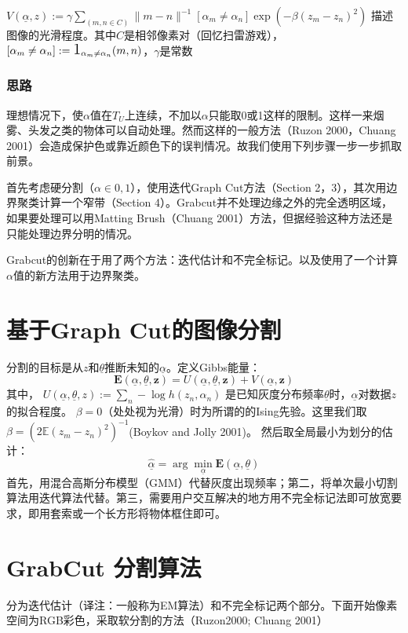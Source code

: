 \documentclass[a4paper, 11pt, nofonts, nocap, fancyhdr, hyperref, UTF8]{ctexart}
\begin{document}
$V(\underline{\alpha},z) := \gamma \sum_{(m,n \in C)} \|m-n\|^{-1}[\alpha_m \neq \alpha_n]  \exp (-\beta(z_m - z_n)^2)$  描述图像的光滑程度。其中$C$是相邻像素对（回忆扫雷游戏），$[\alpha_m \neq \alpha_n] := \text{\Large 1}_{\alpha_m \neq \alpha_n}(m,n)$，$\gamma$是常数

\subsubsection{思路}
理想情况下，使$\alpha$值在$T_U$上连续，不加以$\alpha$只能取0或1这样的限制。这样一来烟雾、头发之类的物体可以自动处理。然而这样的一般方法（Ruzon 2000，Chuang 2001）会造成保护色或靠近颜色下的误判情况。故我们使用下列步骤一步一步抓取前景。

首先考虑硬分割（$\alpha \in {0,1}$），使用迭代Graph Cut方法（Section 2，3），其次用边界聚类计算一个窄带（Section 4）。Grabcut并不处理边缘之外的完全透明区域，如果要处理可以用Matting Brush（Chuang 2001）方法，但据经验这种方法还是只能处理边界分明的情况。

Grabcut的创新在于用了两个方法：迭代估计和不完全标记。以及使用了一个计算$\alpha$值的新方法用于边界聚类。

\section{基于Graph Cut的图像分割}
分割的目标是从$z$和$\underline{\theta}$推断未知的$\underline{\alpha}$。定义Gibbs能量：
$$
\textbf{E}(\underline{\alpha},\underline{\theta},\textbf{z}) = U(\underline{\alpha},\underline{\theta},\textbf{z})+V(\underline{\alpha},\textbf{z})
$$
其中，
$U(\underline{\alpha},\underline{\theta},z) := \sum_n -\log h(z_n, \alpha_n)$
是已知灰度分布频率$\underline{\theta}$时，$\underline{\alpha}$对数据$z$的拟合程度。
$\beta = 0$（处处视为光滑）时为所谓的的Ising先验。这里我们取$\beta = (2\mathbb{E}(z_m-z_n)^2)^{-1}$(Boykov and Jolly 2001)。
然后取全局最小为划分的估计：
$$
\hat{\underline{\alpha}} = \arg \min \limits_{\underline{\alpha}} \textbf{E}(\underline{\alpha},\underline{\theta})
$$
首先，用混合高斯分布模型（GMM）代替灰度出现频率；第二，将单次最小切割算法用迭代算法代替。第三，需要用户交互解决的地方用不完全标记法即可放宽要求，即用套索或一个长方形将物体框住即可。

\section{GrabCut 分割算法}
分为迭代估计（译注：一般称为EM算法）和不完全标记两个部分。下面开始像素空间为RGB彩色，采取软分割的方法（Ruzon2000; Chuang 2001）
\end{document}
